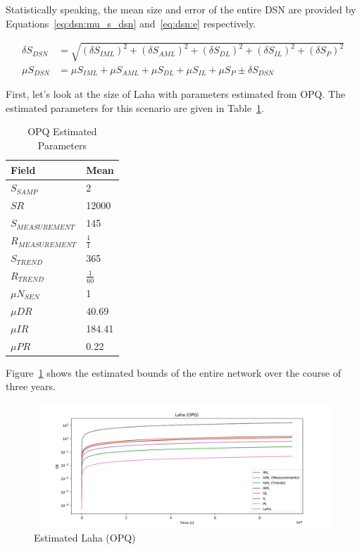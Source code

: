 Statistically speaking, the mean size and error of the entire DSN are provided by Equations~\ref{eq:dsn:mu_s_dsn} and~\ref{eq:dsn:e} respectively.

\begin{align}
	\delta S_{DSN} &= \sqrt{(\delta S_{IML})^2 + (\delta S_{AML})^2 + (\delta S_{DL})^2 + (\delta S_{IL})^2 + (\delta S_{P})^2} \label{eq:dsn:e} \\
	\mu S_{DSN} &= \mu S_{IML} + \mu S_{AML} + \mu S_{DL} + \mu S_{IL} + \mu S_{P} \pm \delta S_{DSN} \label{eq:dsn:mu_s_dsn}
\end{align}

First, let's look at the size of Laha with parameters estimated from OPQ. The estimated parameters for this scenario are given in Table~\ref{table:estimated_laha_opq}.

\begin{table}[H]
	\centering
	\caption{OPQ Estimated Parameters}
	\begin{tabularx}{\textwidth}{ll}
		\toprule
		\textbf{Field} & \textbf{Mean} \\
		\midrule
		$S_{SAMP}$ & 2 \\
		$SR$ & 12000 \\
		$S_{MEASUREMENT}$ & 145 \\
		$R_{MEASUREMENT}$ & $\frac{1}{1}$ \\
		$S_{TREND}$ & 365  \\
		$R_{TREND}$ & $\frac{1}{60}$  \\
		$\mu N_{SEN}$ & 1  \\
		$\mu DR$ & 40.69  \\
		$\mu IR$ & 184.41 \\
		$\mu PR$ & 0.22 \\
		\bottomrule
	\end{tabularx}
	\label{table:estimated_laha_opq}
\end{table}

Figure~\ref{fig:plot_lala_opq} shows the estimated bounds of the entire network over the course of three years.

\begin{figure}[H]
	\centering
	\includegraphics[width=\linewidth]{figures/plot_laha_opq.png}
	\caption{Estimated Laha (OPQ)}
	\label{fig:plot_lala_opq}
\end{figure}

